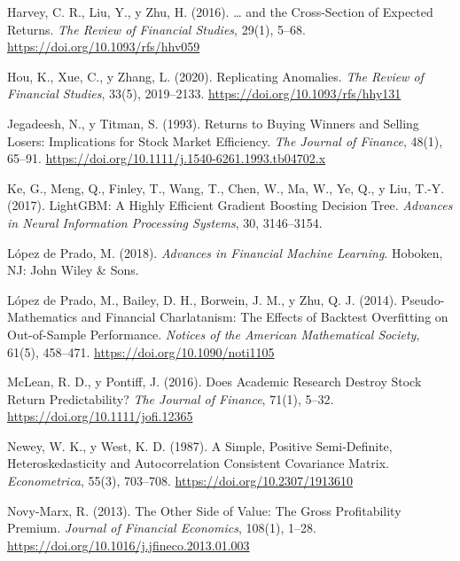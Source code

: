 \begin{list}{}{%
  \setlength{\leftmargin}{2em}%
  \setlength{\itemindent}{-2em}%
  \setlength{\itemsep}{0.55em}%
  \setlength{\parsep}{0pt}%
}
\item Harvey, C. R., Liu, Y., y Zhu, H. (2016). \ldots{} and the Cross-Section of Expected Returns.
  \textit{The Review of Financial Studies}, 29(1), 5--68.
  \url{https://doi.org/10.1093/rfs/hhv059}

\item Hou, K., Xue, C., y Zhang, L. (2020). Replicating Anomalies.
  \textit{The Review of Financial Studies}, 33(5), 2019--2133.
  \url{https://doi.org/10.1093/rfs/hhy131}

\item Jegadeesh, N., y Titman, S. (1993). Returns to Buying Winners and Selling Losers:
  Implications for Stock Market Efficiency. \textit{The Journal of Finance}, 48(1), 65--91.
  \url{https://doi.org/10.1111/j.1540-6261.1993.tb04702.x}

\item Ke, G., Meng, Q., Finley, T., Wang, T., Chen, W., Ma, W., Ye, Q., y Liu, T.-Y. (2017).
  LightGBM: A Highly Efficient Gradient Boosting Decision Tree.
  \textit{Advances in Neural Information Processing Systems}, 30, 3146--3154.

\item López de Prado, M. (2018). \textit{Advances in Financial Machine Learning}.
  Hoboken, NJ: John Wiley \& Sons.

\item López de Prado, M., Bailey, D. H., Borwein, J. M., y Zhu, Q. J. (2014). Pseudo-Mathematics
  and Financial Charlatanism: The Effects of Backtest Overfitting on Out-of-Sample Performance.
  \textit{Notices of the American Mathematical Society}, 61(5), 458--471.
  \url{https://doi.org/10.1090/noti1105}

\item McLean, R. D., y Pontiff, J. (2016). Does Academic Research Destroy Stock Return
  Predictability? \textit{The Journal of Finance}, 71(1), 5--32.
  \url{https://doi.org/10.1111/jofi.12365}

\item Newey, W. K., y West, K. D. (1987). A Simple, Positive Semi-Definite,
  Heteroskedasticity and Autocorrelation Consistent Covariance Matrix.
  \textit{Econometrica}, 55(3), 703--708.
  \url{https://doi.org/10.2307/1913610}

\item Novy-Marx, R. (2013). The Other Side of Value: The Gross Profitability Premium.
  \textit{Journal of Financial Economics}, 108(1), 1--28.
  \url{https://doi.org/10.1016/j.jfineco.2013.01.003}


\end{list}
